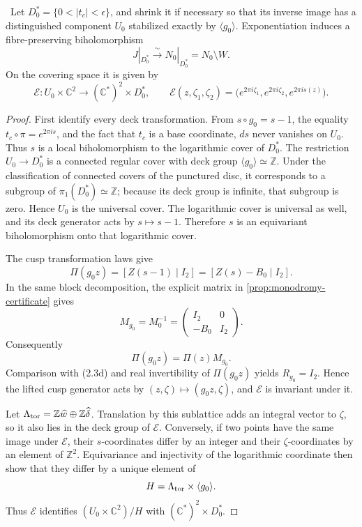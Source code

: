 \begin{proposition}
\label{prop:candidate-cusp-overlap}
\Verified\ Let \(D_0^*=\{0<|t_c|<\epsilon\}\), and shrink it if necessary
so that its inverse image has a distinguished component \(U_0\) stabilized
exactly by \(\langle g_0\rangle\).  Exponentiation induces a
fibre-preserving biholomorphism
\[
 J|_{D_0^*}\xrightarrow{\ \sim\ }
 N_0|_{D_0^*}=N_0\setminus W.
\tag{2.8i}
\]
On the covering space it is given by
\[
 \mathcal E:U_0\times\mathbb C^2\longrightarrow
             (\mathbb C^*)^2\times D_0^*,
 \qquad
 \mathcal E(z,\zeta_1,\zeta_2)
 =\bigl(e^{2\pi i\zeta_1},e^{2\pi i\zeta_2},e^{2\pi is(z)}\bigr).
\tag{2.8ii}
\]
\end{proposition}

\begin{proof}
First identify every deck transformation.  From
\(s\circ g_0=s-1\), the equality
\(t_c\circ\pi=e^{2\pi is}\), and the fact that \(t_c\) is a base
coordinate, \(ds\) never vanishes on \(U_0\).  Thus \(s\) is a local
biholomorphism to the logarithmic cover of \(D_0^*\).  The restriction
\(U_0\to D_0^*\) is a connected regular cover with deck group
\(\langle g_0\rangle\simeq\mathbb Z\).  Under the classification of connected
covers of the punctured disc, it corresponds to a subgroup of
\(\pi_1(D_0^*)\simeq\mathbb Z\); because its deck group is infinite, that
subgroup is zero.  Hence \(U_0\) is the universal cover.  The logarithmic
cover is universal as well, and its deck generator acts by
\(s\mapsto s-1\).  Therefore \(s\) is an equivariant biholomorphism onto that
logarithmic cover.

The cusp transformation laws give
\[
 \Pi(g_0z)=[Z(s-1)\mid I_2]=[Z(s)-B_0\mid I_2].
\]
In the same block decomposition, the explicit matrix in
\cref{prop:monodromy-certificate} gives
\[
 M_{g_0}=M_0^{-1}
 =\begin{pmatrix}I_2&0\\-B_0&I_2\end{pmatrix}.
\]
Consequently
\[
 \Pi(g_0z)=\Pi(z)M_{g_0}.
\]
Comparison with (2.3d) and real invertibility of \(\Pi(g_0z)\) yields
\(R_{g_0}=I_2\).  Hence the lifted cusp generator acts by
\((z,\zeta)\mapsto(g_0z,\zeta)\), and \(\mathcal E\) is invariant under it.

Let
\(\Lambda_{\rm tor}=\mathbb Z\widehat w\oplus
\mathbb Z\widehat\delta\).  Translation by this sublattice adds an integral
vector to \(\zeta\), so it also lies in the deck group of \(\mathcal E\).
Conversely, if two points have the same image under \(\mathcal E\), their
\(s\)-coordinates differ by an integer and their \(\zeta\)-coordinates by
an element of \(\mathbb Z^2\).  Equivariance and injectivity of the
logarithmic coordinate then show that they differ by a unique element of
\[
 H=\Lambda_{\rm tor}\times\langle g_0\rangle.
\]
Thus \(\mathcal E\) identifies
\((U_0\times\mathbb C^2)/H\) with
\((\mathbb C^*)^2\times D_0^*\).


\end{proof}
